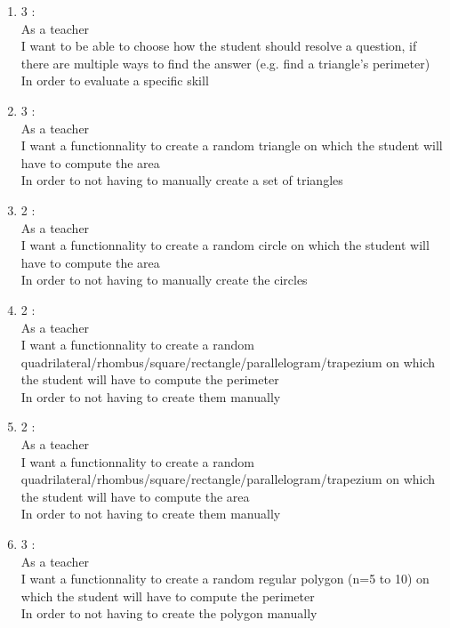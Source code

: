 \documentclass{article}
\begin{document}
\begin{enumerate}
    \item 3 :\\
    As a teacher\\ %
    I want to be able to choose how the student should resolve a question, if there are multiple ways to find the answer (e.g. find a triangle's perimeter)\\
    In order to evaluate a specific skill\\
    
    \item 3 :\\
    As a teacher\\ %
    I want a functionnality to create a random triangle on which the student will have to compute the area\\
    In order to not having to manually create a set of triangles\\
    
    \item 2 :\\
    As a teacher\\ %
    I want a functionnality to create a random circle on which the student will have to compute the area\\
    In order to not having to manually create the circles\\
    
    \item 2 :\\
    As a teacher\\ %
    I want a functionnality to create a random quadrilateral/rhombus/square/rectangle/parallelogram/trapezium on which the student will have to compute the perimeter\\
    In order to not having to create them manually\\
    
    \item 2 :\\ %
    As a teacher\\
    I want a functionnality to create a random quadrilateral/rhombus/square/rectangle/parallelogram/trapezium on which the student will have to compute the area\\
    In order to not having to create them manually\\
    
    \item 3 :\\ %
    As a teacher\\
    I want a functionnality to create a random regular polygon (n=5 to 10) on which the student will have to compute the perimeter\\
    In order to not having to create the polygon manually\\
    

\end{enumerate}
\end{document}
